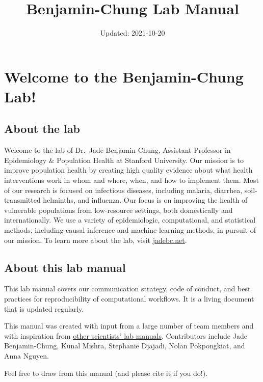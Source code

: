 \documentclass[
]{book}
\title{Benjamin-Chung Lab Manual}
\author{}
\date{\vspace{-2.5em}Updated: 2021-10-20}
\begin{document}
\maketitle

{
\setcounter{tocdepth}{1}
\tableofcontents
}
\hypertarget{welcome-to-the-benjamin-chung-lab}{%
\chapter{Welcome to the Benjamin-Chung Lab!}\label{welcome-to-the-benjamin-chung-lab}}

\hypertarget{about-the-lab}{%
\section{About the lab}\label{about-the-lab}}

Welcome to the lab of Dr.~Jade Benjamin-Chung, Assistant Professor in Epidemiology \& Population Health at Stanford University. Our mission is to improve population health by creating high quality evidence about what health interventions work in whom and where, when, and how to implement them. Most of our research is focused on infectious diseases, including malaria, diarrhea, soil-transmitted helminths, and influenza. Our focus is on improving the health of vulnerable populations from low-resource settings, both domestically and internationally. We use a variety of epidemiologic, computational, and statistical methods, including causal inference and machine learning methods, in pursuit of our mission. To learn more about the lab, visit \href{https://jadebc.net}{jadebc.net}.

\hypertarget{about-this-lab-manual}{%
\section{About this lab manual}\label{about-this-lab-manual}}

This lab manual covers our communication strategy, code of conduct, and best practices for reproducibility of computational workflows. It is a living document that is updated regularly.

This manual was created with input from a large number of team members and with inspiration from \href{https://github.com/alylab/labmanual/blob/master/aly-lab-manual.pdf}{other scientists' lab manuals}.
Contributors include Jade Benjamin-Chung, Kunal Mishra, Stephanie Djajadi, Nolan Pokpongkiat, and Anna Nguyen.

Feel free to draw from this manual (and please cite it if you do!).
\end{document}
